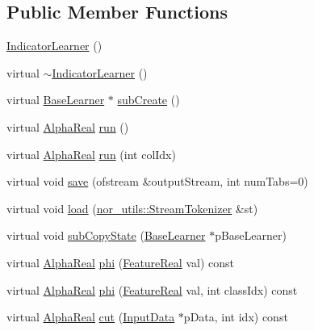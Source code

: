 \subsection*{Public Member Functions}
\begin{DoxyCompactItemize}
\item 
\hyperlink{classMultiBoost_1_1IndicatorLearner_a0dbdb5de3f239e23b989c9ca2d8c1917}{IndicatorLearner} ()
\item 
virtual \hyperlink{classMultiBoost_1_1IndicatorLearner_a2df32d7f761265bc1ad243cf4d9e0262}{$\sim$IndicatorLearner} ()
\item 
virtual \hyperlink{classMultiBoost_1_1BaseLearner}{BaseLearner} $\ast$ \hyperlink{classMultiBoost_1_1IndicatorLearner_a27db4cf56fa20bbf125a82594ff6d9ac}{subCreate} ()
\item 
virtual \hyperlink{Defaults_8h_a80184c4fd10ab70a1a17c5f97dcd1563}{AlphaReal} \hyperlink{classMultiBoost_1_1IndicatorLearner_af6ebc02b7c3c99c3a37c29b8b315786c}{run} ()
\item 
virtual \hyperlink{Defaults_8h_a80184c4fd10ab70a1a17c5f97dcd1563}{AlphaReal} \hyperlink{classMultiBoost_1_1IndicatorLearner_a8ecd0b8a6454b9b6648db679183035b4}{run} (int colIdx)
\item 
virtual void \hyperlink{classMultiBoost_1_1IndicatorLearner_a66dfec334db068b3ab5806723b4170b4}{save} (ofstream \&outputStream, int numTabs=0)
\item 
virtual void \hyperlink{classMultiBoost_1_1IndicatorLearner_ab4e079f316f5d882392839aa02f67d16}{load} (\hyperlink{classnor__utils_1_1StreamTokenizer}{nor\_\-utils::StreamTokenizer} \&st)
\item 
virtual void \hyperlink{classMultiBoost_1_1IndicatorLearner_a47fb712bf8e44ebd7a7af759423b8fcc}{subCopyState} (\hyperlink{classMultiBoost_1_1BaseLearner}{BaseLearner} $\ast$pBaseLearner)
\item 
virtual \hyperlink{Defaults_8h_a80184c4fd10ab70a1a17c5f97dcd1563}{AlphaReal} \hyperlink{classMultiBoost_1_1IndicatorLearner_a83002a7c378de9a4cedd65f54e677955}{phi} (\hyperlink{Defaults_8h_a3a11cfe6a5d469d921716ca6291e934f}{FeatureReal} val) const 
\item 
virtual \hyperlink{Defaults_8h_a80184c4fd10ab70a1a17c5f97dcd1563}{AlphaReal} \hyperlink{classMultiBoost_1_1IndicatorLearner_ad6da91b334f6624773fb671a3f2ffc3b}{phi} (\hyperlink{Defaults_8h_a3a11cfe6a5d469d921716ca6291e934f}{FeatureReal} val, int classIdx) const 
\item 
virtual \hyperlink{Defaults_8h_a80184c4fd10ab70a1a17c5f97dcd1563}{AlphaReal} \hyperlink{classMultiBoost_1_1IndicatorLearner_a80e95e42cb85dcfa8575919269099c34}{cut} (\hyperlink{classMultiBoost_1_1InputData}{InputData} $\ast$pData, int idx) const 
\end{DoxyCompactItemize}
